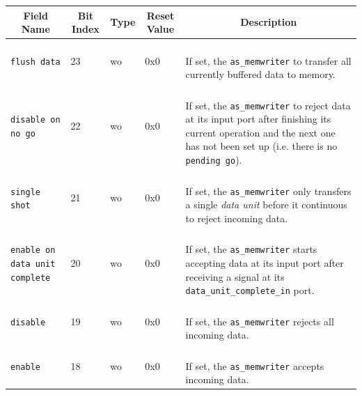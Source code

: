 \begin{longtable}[ht]{|l|l|l|l|l|}
    \hline
    \multicolumn{1}{|c|}{\textbf{Field Name}} & \multicolumn{1}{c|}{\textbf{Bit Index}} & \multicolumn{1}{c|}{\textbf{Type}} & \multicolumn{1}{c|}{\textbf{Reset Value}} & \multicolumn{1}{c|}{\textbf{Description}}\\
    \hline
    
    \texttt{flush data} & 23 & wo & 0x0 & \parbox{5cm}{\ \\
        If set, the \texttt{as\_memwriter} to transfer all currently buffered data to memory.\\
    }\\
    \hline
    
    \texttt{disable on no go} & 22 & wo & 0x0 & \parbox{5cm}{\ \\
        If set, the \texttt{as\_memwriter} to reject data at its input port after finishing its current operation and the next one has not been set up (i.e. there is no \texttt{pending go}).\\
    }\\
    \hline
    
    \texttt{single shot} & 21 & wo & 0x0 & \parbox{5cm}{\ \\
        If set, the \texttt{as\_memwriter} only transfers a single \textit{data unit} before it continuous to reject incoming data.\\
    }\\
    \hline
    
    \parbox{3cm}{\texttt{enable on data unit complete}} & 20 & wo & 0x0 & \parbox{5cm}{\ \\
        If set, the \texttt{as\_memwriter} starts accepting data at its input port after receiving a signal at its \texttt{data\_unit\_complete\_in} port.\\
    }\\
    \hline
    
    \texttt{disable} & 19 & wo & 0x0 & \parbox{5cm}{\ \\
        If set, the \texttt{as\_memwriter} rejects all incoming data.\\
    }\\
    \hline
    
    \texttt{enable} & 18 & wo & 0x0 & \parbox{5cm}{\ \\
        If set, the \texttt{as\_memwriter} accepts incoming data.\\
    }\\
    \hline
    

\end{longtable}
